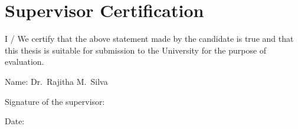 \chapter*{Supervisor Certification}
\thispagestyle{empty}

I / We certify that the above statement made by the candidate is true and that this thesis is
suitable for submission to the University for the purpose of evaluation.

\vspace{2cm}
\noindent Name: Dr.\ Rajitha M.\ Silva

\noindent Signature of the supervisor: \underline{\hspace{6cm}}

\noindent Date: \underline{\hspace{6cm}}
